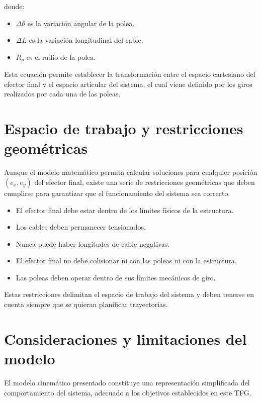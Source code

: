donde:

\begin{itemize}
\item $\Delta\theta$ es la variación angular de la polea.
\item $\Delta L$ es la variación longitudinal del cable.
\item $R_p$ es el radio de la polea.
\end{itemize}

Esta ecuación permite establecer la transformación entre el espacio cartesiano del efector final y el espacio articular del sistema, el cual viene definido por los giros realizados por cada una de las poleas.

\newpage

\section{Espacio de trabajo y restricciones geométricas}
\label{sec:segundaseccion}

Aunque el modelo matemático permita calcular soluciones para cualquier posición $(e_x, e_y)$ del efector final, existe una serie de restricciones geométricas que deben cumplirse para garantizar que el funcionamiento del sistema sea correcto:

\begin{itemize}
\item El efector final debe estar dentro de los límites físicos de la estructura.
\item Los cables deben permanecer tensionados.
\item Nunca puede haber longitudes de cable negativas.
\item El efector final no debe colisionar ni con las poleas ni con la estructura.
\item Las poleas deben operar dentro de sus límites mecánicos de giro.
\end{itemize}

Estas restricciones delimitan el espacio de trabajo del sistema y deben tenerse en cuenta siempre que se quieran planificar trayectorias.

\section{Consideraciones y limitaciones del modelo}
\label{sec:segundaseccion}

El modelo cinemático presentado constituye una representación simplificada del comportamiento del sistema, adecuado a los objetivos establecidos en este TFG.

